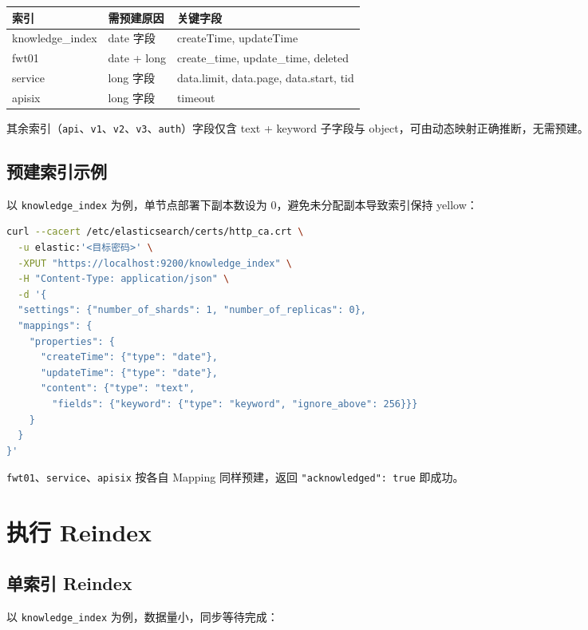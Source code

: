 \documentclass[11pt,a4paper,openany]{ctexbook}
\begin{document}
\begin{center}
\begin{tabular}{@{}lll@{}}
\toprule
索引 & 需预建原因 & 关键字段 \\
\midrule
knowledge\_index & date 字段 & createTime, updateTime \\
fwt01 & date + long & create\_time, update\_time, deleted \\
service & long 字段 & data.limit, data.page, data.start, tid \\
apisix & long 字段 & timeout \\
\bottomrule
\end{tabular}
\end{center}

其余索引（\texttt{api}、\texttt{v1}、\texttt{v2}、\texttt{v3}、\texttt{auth}）字段仅含 text + keyword 子字段与 object，可由动态映射正确推断，无需预建。

\section{预建索引示例}

以 \texttt{knowledge\_index} 为例，单节点部署下副本数设为 0，避免未分配副本导致索引保持 yellow：

\begin{lstlisting}[language=bash]
curl --cacert /etc/elasticsearch/certs/http_ca.crt \
  -u elastic:'<目标密码>' \
  -XPUT "https://localhost:9200/knowledge_index" \
  -H "Content-Type: application/json" \
  -d '{
  "settings": {"number_of_shards": 1, "number_of_replicas": 0},
  "mappings": {
    "properties": {
      "createTime": {"type": "date"},
      "updateTime": {"type": "date"},
      "content": {"type": "text",
        "fields": {"keyword": {"type": "keyword", "ignore_above": 256}}}
    }
  }
}'
\end{lstlisting}

\texttt{fwt01}、\texttt{service}、\texttt{apisix} 按各自 Mapping 同样预建，返回 \texttt{"acknowledged": true} 即成功。

\chapter{执行 Reindex}

\section{单索引 Reindex}

以 \texttt{knowledge\_index} 为例，数据量小，同步等待完成：
\end{document}
